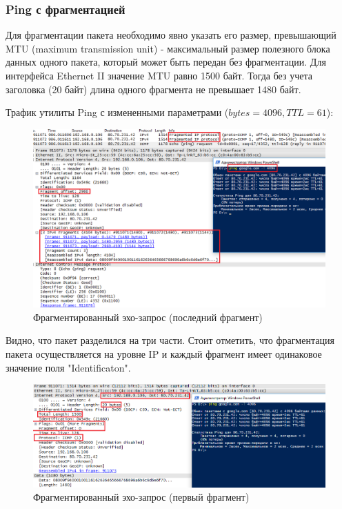 \documentclass[14pt,a4paper,report]{report}
\begin{document}
\clearpage

\subsubsection{Ping с фрагментацией}

Для фрагментации пакета необходимо явно указать его размер, превышающий MTU (maximum transmission unit) - максимальный размер полезного блока данных одного пакета, который может быть передан без фрагментации. Для интерфейса Ethernet II значение MTU равно 1500 байт. Тогда без учета заголовка (20 байт) длина одного фрагмента не превышает 1480 байт.

Трафик утилиты Ping с измененными параметрами ($bytes=4096, TTL=61$):

\begin{figure}[h!]
	\centering
	\includegraphics[scale = 0.66]{images/ping3.png}
	
	\caption{Фрагментированный эхо-запрос (последний фрагмент)}
	\label{image:4}
\end{figure}

Видно, что пакет разделился на три части. Стоит отметить, что фрагментация пакета осуществляется на уровне IP и каждый фрагмент имеет одинаковое значение поля "Identificaton". 

\begin{figure}[h!]
	\centering
	\includegraphics[scale = 0.67]{images/ping4.png}
	
	\caption{Фрагментированный эхо-запрос (первый фрагмент)}
	\label{image:5}
\end{figure}
\end{document}
